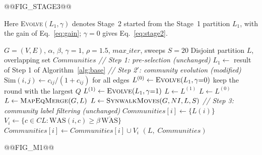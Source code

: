 \documentclass[conference]{IEEEtran}
\newcommand{\algcomment}[1]{\Statex \textit{// #1}}
\begin{document}
@@FIG_STAGE3@@

\noindent Here \textsc{Evolve}$(L_1,\gamma)$ denotes Stage~2 started from the Stage~1 partition $L_1$, with the gain of Eq.~\eqref{eq:gain}; $\gamma=0$ gives Eq.~\eqref{eq:stage2}.

\begin{algorithm}[!t]
\footnotesize
\caption{Proposed pipeline (SN-LPA)}\label{alg:ours}
\begin{algorithmic}[1]
\Require $G=(V,E)$, $\alpha$, $\beta$, $\gamma{=}1$, $\rho{=}1.5$, $max\_iter$, sweeps $S{=}20$
\Ensure Disjoint partition $L$, overlapping set $Communities$
\algcomment{Step 1: pre-selection (unchanged)}
\State $L_1\gets$ result of Step 1 of Algorithm~\ref{alg:base}
\algcomment{Step 2$'$: community evolution (modified)}
\State $\mathrm{Sim}(i,j)\gets c_{ij}/(1+c_{ij})$ for all edges 
\State $L^{(0)}\gets\textsc{Evolve}(L_1,\gamma{=}0)$ 
\State \hspace{\algorithmicindent}keep the round with the largest $Q$ 
\State $L^{(1)}\gets\textsc{Evolve}(L_1,\gamma{=}1)$ 
 
  \State $L\gets L^{(1)}$
\Else
  \State $L\gets L^{(0)}$
\EndIf
\State $L\gets\textsc{MapEqMerge}(G,L)$ 
\State $L\gets\textsc{SynwalkMoves}(G,NI,L,S)$ 
\algcomment{Step 3: community label filtering (unchanged)}
 $Communities[i]\gets\{L(i)\}$ \EndFor
{}
  \State $V_i\gets\{c\in CL:\mathrm{WAS}(i,c)\ge\beta\,\overline{\mathrm{WAS}}\}$
  \State $Communities[i]\gets Communities[i]\cup V_i$
\EndFor
\State \Return $(L,\;Communities)$
\end{algorithmic}
\end{algorithm}









@@FIG_M1@@
\end{document}
